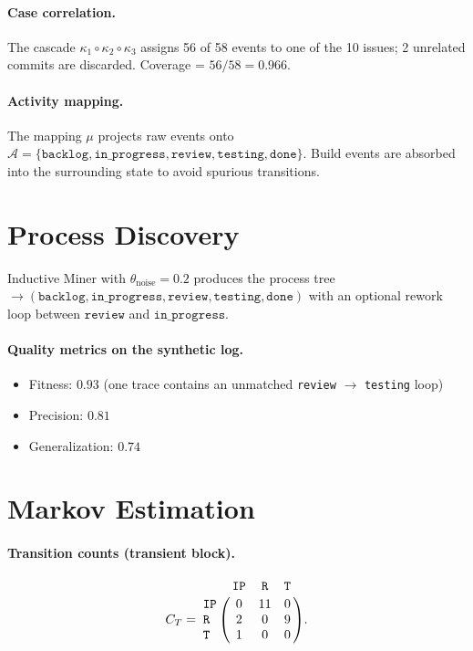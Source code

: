 \paragraph{Case correlation.} The cascade $\kappa_1 \circ \kappa_2 \circ
\kappa_3$ assigns 56 of 58 events to one of the 10 issues; 2 unrelated
commits are discarded. Coverage = $56/58 = 0.966$.

\paragraph{Activity mapping.} The mapping $\mu$ projects raw events onto
$\mathcal{A} = \{\mathtt{backlog}, \mathtt{in\_progress},
\mathtt{review}, \mathtt{testing}, \mathtt{done}\}$. Build events are
absorbed into the surrounding state to avoid spurious transitions.


\section{Process Discovery}
\label{app:D-discovery}

Inductive Miner with $\theta_{\text{noise}} = 0.2$ produces the process
tree
$\to(\mathtt{backlog}, \mathtt{in\_progress}, \mathtt{review},
   \mathtt{testing}, \mathtt{done})$
with an optional rework loop between $\mathtt{review}$ and
$\mathtt{in\_progress}$.

\paragraph{Quality metrics on the synthetic log.}
\begin{itemize}
  \item Fitness: $0.93$ (one trace contains an unmatched
    \texttt{review} $\to$ \texttt{testing} loop)
  \item Precision: $0.81$
  \item Generalization: $0.74$
\end{itemize}


\section{Markov Estimation}
\label{app:D-markov}

\paragraph{Transition counts (transient block).}
\begin{equation*}
C_T = \bordermatrix{
   & \mathtt{IP} & \mathtt{R} & \mathtt{T} \cr
\mathtt{IP} & 0 & 11 & 0 \cr
\mathtt{R}  & 2 & 0  & 9 \cr
\mathtt{T}  & 1 & 0  & 0 \cr}.
\end{equation*}

